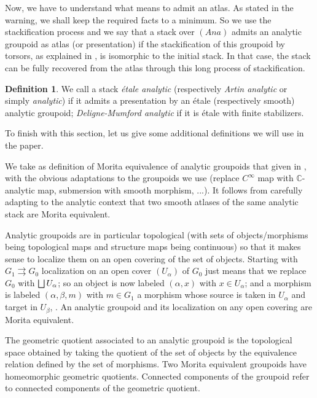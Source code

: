 \documentclass[JEP,XML,SOM,Unicode]{cedram}
\let\oldbigsqcup\bigsqcup
\renewcommand{\bigsqcup}{\mathop{\textstyle\oldbigsqcup}\displaylimits}
\newcommand{\Ana}{\mathit{Ana}}
\theoremstyle{plain}
\theoremstyle{definition}
\newtheorem{definition}[theorem]{Definition}
\theoremstyle{remark}
\numberwithin{equation}{section}
\newcommand{\CC}{{\mathbb{C}}}
\begin{document}
Now, we have to understand what means to admit an atlas. As stated in the warning, we shall keep the required facts to a minimum. So we use the stackification process and we say that a stack over $(\Ana)$ admits an analytic groupoid as atlas (or presentation) if the stackification of this groupoid by torsors, as explained in \cite[Chs.\,3\,\&\,4]{BCEFFGK}, is isomorphic to the initial stack. In that case, the stack can be fully recovered from the atlas through this long process of stackification.

\begin{definition}
\label{Artinstacks}
We call a stack \emph{étale analytic} (respectively \emph{Artin analytic} or simply \emph{analytic}) if it admits a presentation by an étale (respectively smooth) analytic groupoid; \emph{Deligne-Mumford analytic} if it is étale with finite stabilizers.
\end{definition}

To finish with this section, let us give some additional definitions we will use in the paper.

We take as definition of Morita equivalence of analytic groupoids that given in \cite[\S 5.4]{Moerdijk}, with the obvious adaptations to the groupoids we use (\eg replace $C^\infty$ map with $\CC$-analytic map, submersion with smooth morphism, ...). It follows from carefully adapting \cite{BCEFFGK} to the analytic context that two smooth atlases of the same analytic stack are Morita equivalent.

Analytic groupoids are in particular topological (\ie with sets of objects/morphisms being topological maps and structure maps being continuous) so that it makes sense to localize them on an open covering of the set of objects. Starting with $G_1\rightrightarrows G_0$ localization on an open cover $(U_\alpha)$ of $G_0$ just means that we replace $G_0$ with $\bigsqcup U_\alpha$; so an object is now labeled $(\alpha,x)$ with $x\in U_\alpha$; and a morphism is labeled $(\alpha,\beta,m)$ with $m\in G_1$ a morphism whose source is taken in $U_\alpha$ and target in $U_\beta$, \cf \cite{Ha}. An analytic groupoid and its localization on any open covering are Morita equivalent.

The geometric quotient associated to an analytic groupoid is the topological space obtained by taking the quotient of the set of objects by the equivalence relation \hbox{defined} by the set of morphisms. Two Morita equivalent groupoids have homeomorphic geometric quotients. Connected components of the groupoid refer to connected components of the geometric quotient.
\end{document}
